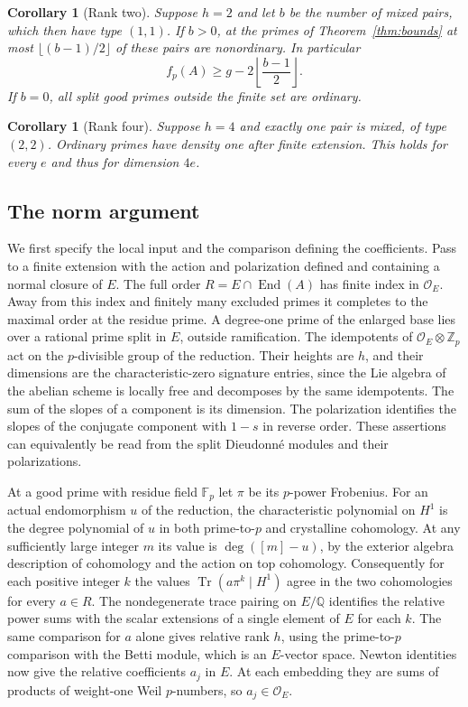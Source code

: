 \documentclass[11pt]{article}
\newtheorem{corollary}[theorem]{Corollary}
\theoremstyle{definition}
\DeclareMathOperator{\Tr}{Tr}
\newcommand{\Q}{\mathbb Q}
\newcommand{\Z}{\mathbb Z}
\newcommand{\fp}{f_p}
\begin{document}
\begin{corollary}[Rank two]\label{cor:ranktwo}
Suppose \(h=2\) and let \(b\) be the number of mixed pairs, which
then have type \((1,1)\). If \(b>0\), at the primes of
Theorem~\ref{thm:bounds} at most \(\lfloor(b-1)/2\rfloor\) of these
pairs are nonordinary. In particular
\[
 \fp(A)\ge g-2\left\lfloor\frac{b-1}{2}\right\rfloor .
\]
If \(b=0\), all split good primes outside the finite set are ordinary.
\end{corollary}

\begin{corollary}[Rank four]\label{cor:rankfour}
Suppose \(h=4\) and exactly one pair is mixed, of type \((2,2)\).
Ordinary primes have density one after finite extension. This holds
for every \(e\) and thus for dimension \(4e\).
\end{corollary}

\subsection{The norm argument}

We first specify the local input and the comparison defining the
coefficients. Pass to a finite extension with the action and polarization
defined and containing a normal closure of \(E\).
The full order \(R=E\cap\operatorname{End}(A)\) has finite index in
\(\mathcal O_E\). Away from this index and finitely many excluded primes
it completes to the maximal order at the residue prime.
A degree-one prime of the enlarged base lies over a rational prime split
in \(E\), outside ramification. The idempotents of
\(\mathcal O_E\otimes\Z_p\) act on the \(p\)-divisible group of the
reduction. Their heights are \(h\), and their dimensions are the
characteristic-zero signature entries, since the Lie algebra of the
abelian scheme is locally free and decomposes by the same idempotents.
The sum of the slopes of a component is its dimension. The polarization
identifies the slopes of the conjugate component with \(1-s\) in reverse
order. These assertions can equivalently be read from the split
Dieudonn\'e modules and their polarizations.

At a good prime with residue field \(\mathbb F_p\) let \(\pi\) be its
\(p\)-power Frobenius. For an actual endomorphism \(u\) of the
reduction, the characteristic polynomial on \(H^1\) is the degree
polynomial of \(u\) in both prime-to-\(p\) and crystalline cohomology.
At any sufficiently large integer \(m\) its value is
\(\deg([m]-u)\), by the exterior algebra description of cohomology and
the action on top cohomology. Consequently for each positive integer
\(k\) the values \(\Tr(a\pi^k\mid H^1)\) agree in the two
cohomologies for every \(a\in R\).
The nondegenerate trace pairing on \(E/\Q\) identifies the relative
power sums with the scalar extensions of a single element of \(E\)
for each \(k\). The same comparison for \(a\) alone gives relative
rank \(h\), using the prime-to-\(p\) comparison with the Betti
module, which is an \(E\)-vector space. Newton identities now give
the relative coefficients \(a_j\) in \(E\). At each embedding they
are sums of products of weight-one Weil \(p\)-numbers, so
\(a_j\in\mathcal O_E\).
\end{document}
